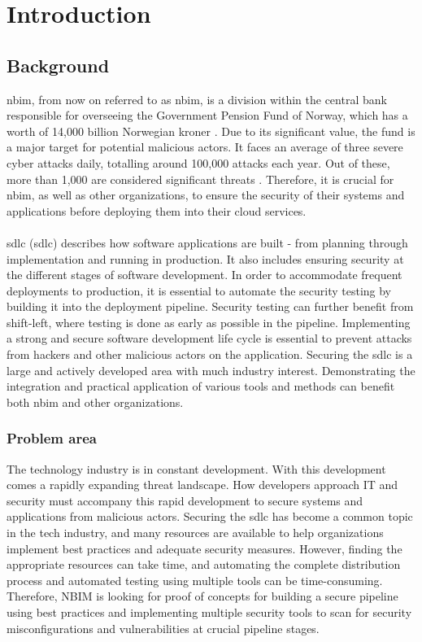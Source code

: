 \newpage
\thispagestyle{empty}
\mbox{}
\chapter{Introduction}

\section{Background} %
\acrlong{nbim}, from now on referred to as \acrshort{nbim}, is a division within the central bank responsible for overseeing the Government Pension Fund of Norway, which has a worth of 14,000 billion Norwegian kroner \cite{nbimwebsite}. Due to its significant value, the fund is a major target for potential malicious actors. It faces an average of three severe cyber attacks daily, totalling around 100,000 attacks each year. Out of these, more than 1,000 are considered significant threats \cite{nbimattacks}. Therefore, it is crucial for \acrshort{nbim}, as well as other organizations, to ensure the security of their systems and applications before deploying them into their cloud services. 
\\~\\
\acrlong{sdlc} (\acrshort{sdlc}) describes how software applications are built - from planning through implementation and running in production. It also includes ensuring security at the different stages of software development. In order to accommodate frequent deployments to production, it is essential to automate the security testing by building it into the deployment pipeline. Security testing can further benefit from shift-left, where testing is done as early as possible in the pipeline. Implementing a strong and secure software development life cycle is essential to prevent attacks from hackers and other malicious actors on the application. 
\newpage
Securing the \acrshort{sdlc} is a large and actively developed area with much industry interest. Demonstrating the integration and practical application of various tools and methods can benefit both \acrshort{nbim} and other organizations.

\subsection{Problem area}
The technology industry is in constant development. With this development comes a rapidly expanding threat landscape. How developers approach IT and security must accompany this rapid development to secure systems and applications from malicious actors. Securing the \acrlong{sdlc} has become a common topic in the tech industry, and many resources are available to help organizations implement best practices and adequate security measures. However, finding the appropriate resources can take time, and automating the complete distribution process and automated testing using multiple tools can be time-consuming. Therefore, NBIM is looking for proof of concepts for building a secure pipeline using best practices and implementing multiple security tools to scan for security misconfigurations and vulnerabilities at crucial pipeline stages. 

